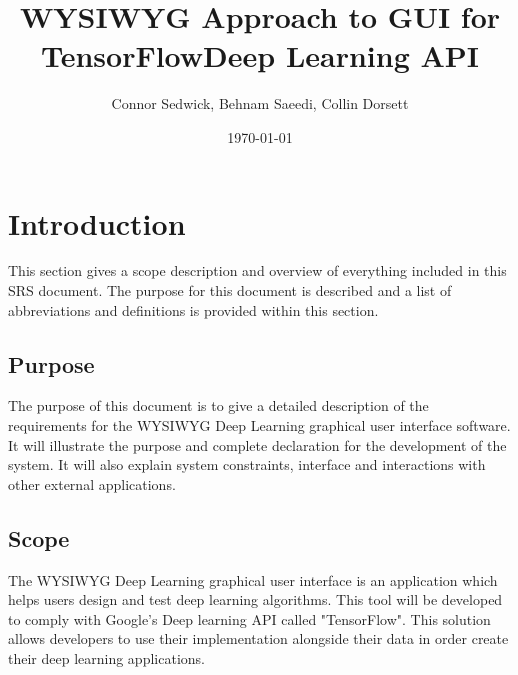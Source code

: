 \documentclass[journal,10pt,onecolumn,compsoc]{IEEEtran} \usepackage[margin=1.0in]{geometry} \usepackage{pdfpages} \usepackage{graphicx}
\title{WYSIWYG Approach to GUI for TensorFlow\texttrademark Deep Learning API}
\author{Connor Sedwick, Behnam Saeedi,  Collin Dorsett}
\date{\today}
\begin{document}
\maketitle
\newpage
\tableofcontents
\newpage
\section{Introduction}

This section gives a scope description and overview of everything included in this SRS document. 
The purpose for this document is described and a list of abbreviations and definitions is provided within this section.

\subsection{Purpose}

The purpose of this document is to give a detailed description of the requirements for the WYSIWYG Deep Learning graphical user interface software. It will illustrate the purpose and complete declaration for the development of the system. It will also explain system constraints, interface and interactions with other external applications. 

\subsection{Scope}

The WYSIWYG Deep Learning graphical user interface is an application which helps users design and test deep learning algorithms.
This tool will be developed to comply with Google's Deep learning API called "TensorFlow\texttrademark".
This solution allows developers to use their implementation alongside their data in order create their deep learning applications.
\end{document}
